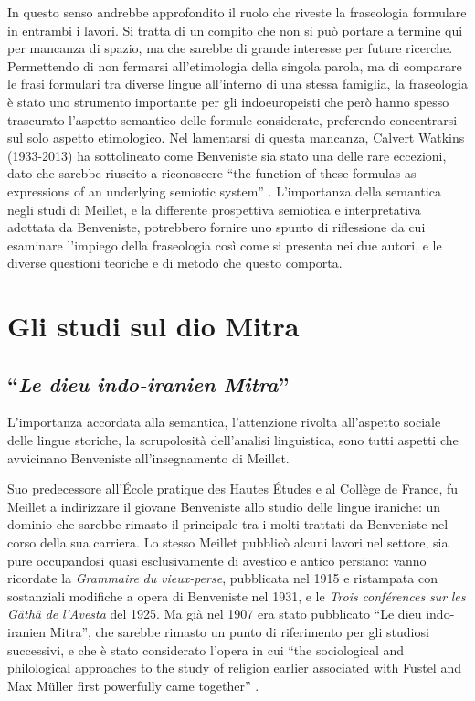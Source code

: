 \documentclass[output=paper]{langsci/langscibook}
\begin{document}
In questo senso andrebbe approfondito il ruolo che riveste la fraseologia formulare in entrambi i lavori. Si tratta di un compito che non si può portare a termine qui per mancanza di spazio, ma che sarebbe di grande interesse per future ricerche.
Permettendo di non fermarsi all’etimologia della singola parola, ma di comparare le frasi formulari tra diverse lingue all’interno di una stessa famiglia, la fraseologia è stato uno strumento importante per gli indoeuropeisti che però hanno spesso trascurato l’aspetto semantico delle formule considerate, preferendo concentrarsi sul solo aspetto etimologico.  Nel lamentarsi di questa mancanza, Calvert Watkins (1933-2013) ha sottolineato come Benveniste sia stato una delle rare eccezioni, dato che sarebbe riuscito a riconoscere “the function of these formulas as expressions of an underlying semiotic system” \citep[43]{watkins_how_1995}. L’importanza della semantica negli studi di Meillet, e la differente prospettiva semiotica e interpretativa adottata da Benveniste, potrebbero fornire uno spunto di riflessione da cui esaminare l’impiego della fraseologia così come si presenta nei due autori, e le diverse questioni teoriche e di metodo che questo comporta.

\section{Gli studi sul dio Mitra}

\subsection{“\textit{Le dieu indo-iranien Mitra}”}

L’importanza accordata alla semantica, l’attenzione rivolta all’aspetto sociale delle lingue storiche, la scrupolosità dell’analisi linguistica, sono tutti aspetti che avvicinano Benveniste all’insegnamento di Meillet.

Suo predecessore all’École pratique des Hautes Études e al Collège de France, fu Meillet a indirizzare il giovane Benveniste allo studio delle lingue iraniche: un dominio che sarebbe rimasto il principale tra i molti trattati da Benveniste nel corso della sua carriera. Lo stesso Meillet pubblicò alcuni lavori nel settore, sia pure occupandosi quasi esclusivamente di avestico e antico persiano: vanno ricordate la \textit{Grammaire} \textit{du} \textit{vieux{}-perse}, pubblicata nel 1915 e ristampata con sostanziali modifiche a opera di Benveniste nel 1931, e le \textit{Trois} \textit{conférences} \textit{sur} \textit{les} \textit{Gâthâ} \textit{de} \textit{l’Avesta} del 1925. Ma già nel 1907 era stato pubblicato “Le dieu indo-iranien Mitra”, che sarebbe rimasto un punto di riferimento per gli studiosi successivi, e che è stato considerato l’opera in cui “the sociological and philological approaches to the study of religion earlier associated with Fustel and Max Müller first powerfully came together” \citep[13]{lincoln_oaths_2012}.
\end{document}

